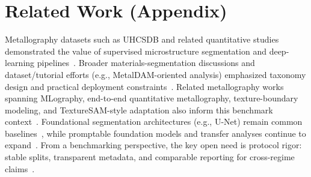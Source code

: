\documentclass{article}
\begin{document}
\clearpage
\appendix

\section{Related Work (Appendix)}
Metallography datasets such as UHCSDB and related quantitative studies demonstrated the value of supervised microstructure segmentation and deep-learning pipelines~\citep{decost2017uhcsdb,decost2019high}. Broader materials-segmentation discussions and dataset/tutorial efforts (e.g., MetalDAM-oriented analysis) emphasized taxonomy design and practical deployment constraints~\citep{luengo2022tutorial}. Related metallography works spanning MLography, end-to-end quantitative metallography, texture-boundary modeling, and TextureSAM-style adaptation also inform this benchmark context~\citep{rusanovsky2020mlography,rusanovsky2022end,rusanovsky2023universal,rusanovsky2025texturesam}. Foundational segmentation architectures (e.g., U-Net) remain common baselines~\citep{ronneberger2015u}, while promptable foundation models and transfer analyses continue to expand~\citep{kirillov2023segment,ji2023segment,ma2024segment}. From a benchmarking perspective, the key open need is protocol rigor: stable splits, transparent metadata, and comparable reporting for cross-regime claims~\citep{mueller2016machine,ramprasad2017machine,decost2020scientific}.
\end{document}
